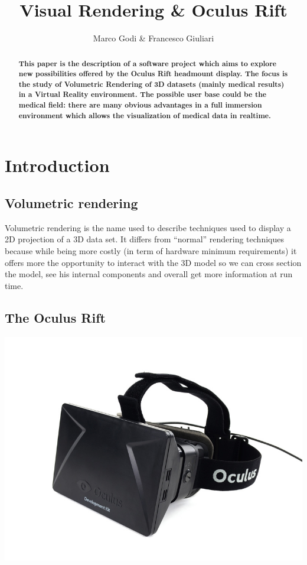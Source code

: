 \documentclass[11pt]{article} %
\title{Visual Rendering \& Oculus Rift}
\author{Marco Godi \& Francesco Giuliari}
\affil{Università degli Studi di Verona}
\begin{document}
\maketitle



\tableofcontents





\newpage
\begin{abstract}
\textbf{ This paper is the description of a software project which aims to explore new possibilities offered by the Oculus Rift headmount display. The focus is the study of Volumetric Rendering of 3D datasets (mainly medical results) in a Virtual Reality environment. The possible user base could be the medical field: there are many obvious advantages in a full immersion environment which allows the visualization of medical data in realtime. }
\end{abstract}
\section {Introduction}


\subsection{Volumetric rendering}
Volumetric rendering is the name used to describe techniques used to display a 2D projection of a 3D data set. It differs from ``normal'' rendering techniques because while being more costly (in term of hardware minimum requirements) it offers more the opportunity to interact with the 3D model so we can cross section the model, see his internal components and overall get more information at run time.  

\subsection{The Oculus Rift}
\includegraphics[scale=0.5]{oculus.jpg}
\end{document}
